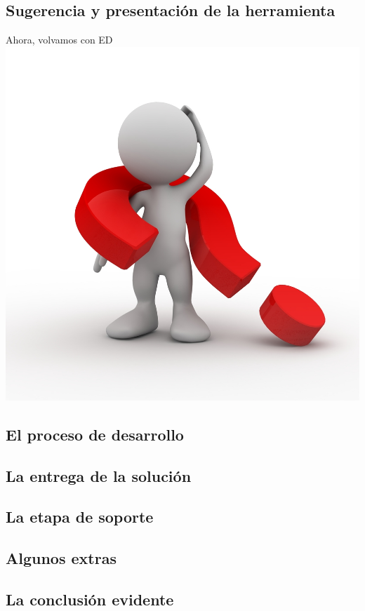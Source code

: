 \subsection{Sugerencia y presentación de la herramienta}
  

\begin{frame}{Ahora, volvamos con ED}
  \centering
  \includegraphics[scale=0.8]{img/hello_ed}
\end{frame}

\subsection{El proceso de desarrollo}
  
\subsection{La entrega de la solución}
  
\subsection{La etapa de soporte}
\subsection{Algunos extras}
\subsection{La conclusión evidente}
